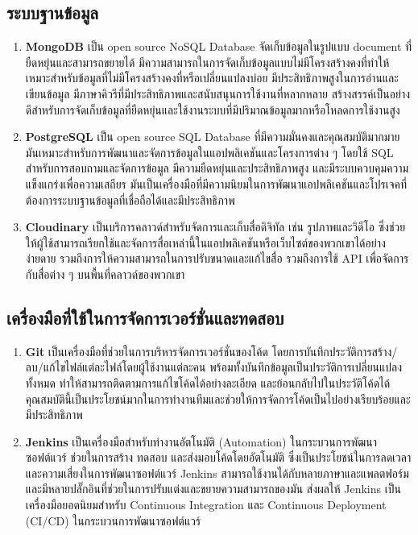 \documentclass[12pt,oneside,openright,a4paper]{cpe-thai-project}
\begin{document}
\subsection{ระบบฐานข้อมูล}

\begin{enumerate}
\item \textbf{MongoDB} เป็น open source NoSQL Database จัดเก็บข้อมูลในรูปแบบ document ที่ยืดหยุ่นและสามารถขยายได้ มีความสามารถในการจัดเก็บข้อมูลแบบไม่มีโครงสร้างคงที่ทำให้เหมาะสำหรับข้อมูลที่ไม่มีโครงสร้างคงที่หรือเปลี่ยนแปลงบ่อย มีประสิทธิภาพสูงในการอ่านและเขียนข้อมูล มีภาษาคิวรีที่มีประสิทธิภาพและสนับสนุนการใช้งานที่หลากหลาย สร้างสรรค์เป็นอย่างดีสำหรับการจัดเก็บข้อมูลที่ยืดหยุ่นและใช้งานระบบที่มีปริมาณข้อมูลมากหรือโหลดการใช้งานสูง
\item \textbf{PostgreSQL} เป็น open source SQL Database ที่มีความมั่นคงและคุณสมบัติมากมาย มันเหมาะสำหรับการพัฒนาและจัดการข้อมูลในแอปพลิเคชันและโครงการต่าง ๆ โดยใช้ SQL สำหรับการสอบถามและจัดการข้อมูล มีความยืดหยุ่นและประสิทธิภาพสูง และมีระบบควบคุมความแข็งแกร่งเพื่อความเสถียร มันเป็นเครื่องมือที่มีความนิยมในการพัฒนาแอปพลิเคชันและโปรเจคที่ต้องการระบบฐานข้อมูลที่เชื่อถือได้และมีประสิทธิภาพ	
\item \textbf{Cloudinary} เป็นบริการคลาวด์สำหรับจัดการและเก็บสื่อดิจิทัล เช่น รูปภาพและวิดีโอ ซึ่งช่วยให้ผู้ใช้สามารถเรียกใช้และจัดการสื่อเหล่านี้ในแอปพลิเคชันหรือเว็บไซต์ของพวกเขาได้อย่างง่ายดาย รวมถึงการให้ความสามารถในการปรับขนาดและแก้ไขสื่อ รวมถึงการใช้ API เพื่อจัดการกับสื่อต่าง ๆ บนพื้นที่คลาวด์ของพวกเขา
\end{enumerate}

\subsection{เครื่องมือที่ใช้ในการจัดการเวอร์ชั่นและทดสอบ}

\begin{enumerate}
\item \textbf{Git} เป็นเครื่องมือที่ช่วยในการบริหารจัดการเวอร์ชั่นของโค้ด โดยการบันทึกประวัติการสร้าง/ลบ/แก้ไขไฟล์แต่ละไฟล์โดยผู้ใช้งานแต่ละคน พร้อมทั้งบันทึกข้อมูลเป็นประวัติการเปลี่ยนแปลงทั้งหมด ทำให้สามารถติดตามการแก้ไขโค้ดได้อย่างละเอียด และย้อนกลับไปในประวัติโค้ดได้ คุณสมบัตินี้เป็นประโยชน์มากในการทำงานทีมและช่วยให้การจัดการโค้ดเป็นไปอย่างเรียบร้อยและมีประสิทธิภาพ 
\item \textbf{Jenkins} เป็นเครื่องมือสำหรับทำงานอัตโนมัติ (Automation) ในกระบวนการพัฒนาซอฟต์แวร์ ช่วยในการสร้าง ทดสอบ และส่งมอบโค้ดโดยอัตโนมัติ ซึ่งเป็นประโยชน์ในการลดเวลาและความเสี่ยงในการพัฒนาซอฟต์แวร์ Jenkins สามารถใช้งานได้กับหลายภาษาและแพลตฟอร์ม และมีหลายปลั๊กอินที่ช่วยในการปรับแต่งและขยายความสามารถของมัน ส่งผลให้ Jenkins เป็นเครื่องมือยอดนิยมสำหรับ Continuous Integration และ Continuous Deployment (CI/CD) ในกระบวนการพัฒนาซอฟต์แวร์
\end{enumerate}
\end{document}
